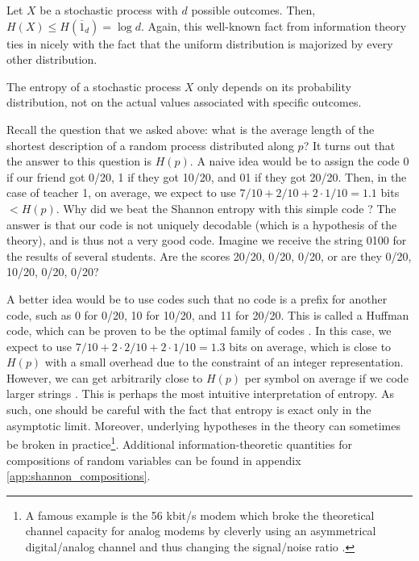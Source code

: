 \begin{remark}
    Let $X$ be a stochastic process with $d$ possible outcomes. Then, $H(X) \leq H\left(\overline{1}_d\right) = \log d$. Again, this well-known fact from information theory ties in nicely with the fact that the uniform distribution is majorized by every other distribution.
\end{remark}

\begin{remark}
    The entropy of a stochastic process $X$ only depends on its probability distribution, not on the actual values associated with specific outcomes.
\end{remark}

Recall the question that we asked above: what is the average length of the shortest description of a random process distributed along $p$? It turns out that the answer to this question is $H(p)$. A naive idea would be to assign the code 0 if our friend got 0/20, 1 if they got 10/20, and 01 if they got 20/20. Then, in the case of teacher 1, on average, we expect to use $7/10 + 2/10 + 2 \cdot 1/10 = 1.1$ bits $< H(p)$. Why did we beat the Shannon entropy with this simple code ? The answer is that our code is not uniquely decodable (which is a hypothesis of the theory), and is thus not a very good code. Imagine we receive the string 0100 for the results of several students. Are the scores 20/20, 0/20, 0/20, or are they 0/20, 10/20, 0/20, 0/20?

A better idea would be to use codes such that no code is a prefix for another code, such as 0 for 0/20, 10 for 10/20, and 11 for 20/20. This is called a Huffman code, which can be proven to be the optimal family of codes \cite[p. 123]{cover_elements_2006}. In this case, we expect to use $7/10 + 2 \cdot 2/10 + 2 \cdot 1/10 = 1.3$ bits on average, which is close to $H(p)$ with a small overhead due to the constraint of an integer representation. However, we can get arbitrarily close to $H(p)$ per symbol on average if we code larger strings \cite[p. 114]{cover_elements_2006}. This is perhaps the most intuitive interpretation of entropy. As such, one should be careful with the fact that entropy is exact only in the asymptotic limit. Moreover, underlying hypotheses in the theory can sometimes be broken in practice\footnote{A famous example is the 56 kbit/s modem which broke the theoretical channel capacity for analog modems by cleverly using an asymmetrical digital/analog channel and thus changing the signal/noise ratio \cite{cover_elements_2006}.}. Additional information-theoretic quantities for compositions of random variables can be found in appendix \ref{app:shannon_compositions}. %

